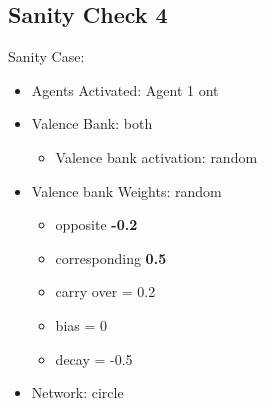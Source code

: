 \documentclass{article}\usepackage[]{graphicx}\usepackage[]{color}
\begin{document}
\subsection{Sanity Check 4}
\label{sec:sanity4}
Sanity Case:
\begin{itemize}
  \item Agents Activated: Agent 1 ont
  \item Valence Bank: both
  \begin{itemize}
      \item Valence bank activation: random
  \end{itemize}
  \item Valence bank Weights: random
  \begin{itemize}
      \item opposite \textbf{-0.2}
      \item corresponding \textbf{0.5}
      \item carry over = 0.2
      \item bias = 0
      \item decay = -0.5
  \end{itemize}
  \item Network: circle
\end{itemize}
%
%

\newpage
\end{document}
